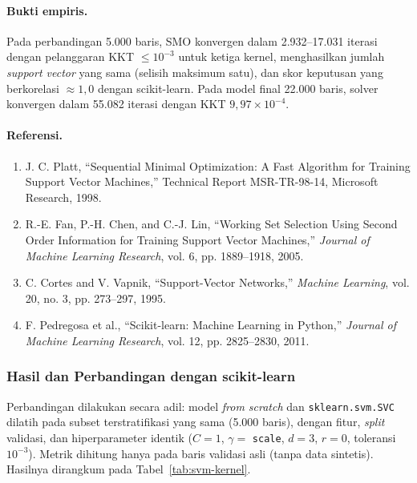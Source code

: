 \paragraph{Bukti empiris.}
Pada perbandingan 5.000 baris, SMO konvergen dalam 2.932--17.031 iterasi
dengan pelanggaran KKT $\le 10^{-3}$ untuk ketiga kernel, menghasilkan jumlah
\textit{support vector} yang sama (selisih maksimum satu), dan skor keputusan
yang berkorelasi $\approx 1{,}0$ dengan scikit-learn. Pada model final 22.000
baris, solver konvergen dalam 55.082 iterasi dengan KKT
$9{,}97\times10^{-4}$.

\paragraph{Referensi.}
\begin{enumerate}
  \item J. C. Platt, ``Sequential Minimal Optimization: A Fast Algorithm for
        Training Support Vector Machines,'' Technical Report MSR-TR-98-14,
        Microsoft Research, 1998.
  \item R.-E. Fan, P.-H. Chen, and C.-J. Lin, ``Working Set Selection Using
        Second Order Information for Training Support Vector Machines,''
        \textit{Journal of Machine Learning Research}, vol. 6,
        pp. 1889--1918, 2005.
  \item C. Cortes and V. Vapnik, ``Support-Vector Networks,''
        \textit{Machine Learning}, vol. 20, no. 3, pp. 273--297, 1995.
  \item F. Pedregosa et al., ``Scikit-learn: Machine Learning in Python,''
        \textit{Journal of Machine Learning Research}, vol. 12,
        pp. 2825--2830, 2011.
\end{enumerate}

\subsubsection{Hasil dan Perbandingan dengan scikit-learn}

Perbandingan dilakukan secara adil: model \textit{from scratch} dan
\texttt{sklearn.svm.SVC} dilatih pada subset terstratifikasi yang sama
(5.000 baris), dengan fitur, \textit{split} validasi, dan hiperparameter identik
($C=1$, $\gamma=$ \texttt{scale}, $d=3$, $r=0$, toleransi $10^{-3}$). Metrik
dihitung hanya pada baris validasi asli (tanpa data sintetis). Hasilnya
dirangkum pada Tabel~\ref{tab:svm-kernel}.

